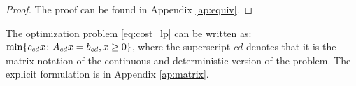 \begin{proof}

The proof can be found in Appendix \ref{ap:equiv}.





\end{proof}



\begin{proposition}
The optimization problem \eqref{eq:cost_lp} can be written as: $\min\{ c_{cd} x \colon A_{cd} x = b_{cd} , x \geq 0\}$, where the superscript $cd$ denotes that it is the matrix notation of the continuous and deterministic version of the problem. The explicit formulation is in Appendix \ref{ap:matrix}.
\end{proposition}

